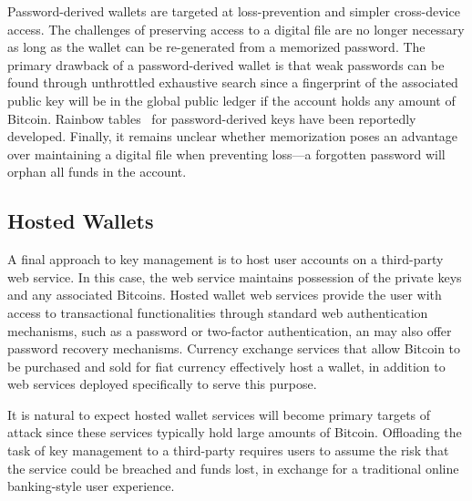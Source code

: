 Password-derived wallets are targeted at loss-prevention and simpler cross-device access. The challenges of preserving access to a digital file are no longer necessary as long as the wallet can be re-generated from a memorized password. The primary drawback of a password-derived wallet is that weak passwords can be found through unthrottled exhaustive search since a fingerprint of the associated public key will be in the global public ledger if the account holds any amount of Bitcoin. Rainbow tables~\cite{rainbowtables} for password-derived keys have been reportedly developed. Finally, it remains unclear whether memorization poses an advantage over maintaining a digital file when preventing loss---a forgotten password will orphan all funds in the account.


\subsection{Hosted Wallets} 
A final approach to key management is to host user accounts on a third-party web service. In this case, the web service maintains possession of the private keys and any associated Bitcoins. Hosted wallet web services provide the user with access to transactional functionalities through standard web authentication mechanisms, such as a password or two-factor authentication, an may also offer password recovery mechanisms. Currency exchange services that allow Bitcoin to be purchased and sold for fiat currency effectively host a wallet, in addition to web services deployed specifically to serve this purpose.


It is natural to expect hosted wallet services will become primary targets of attack since these services typically hold large amounts of Bitcoin. Offloading the task of key management to a third-party requires users to assume the risk that the service could be breached and funds lost, in exchange for a traditional online banking-style user experience. 

